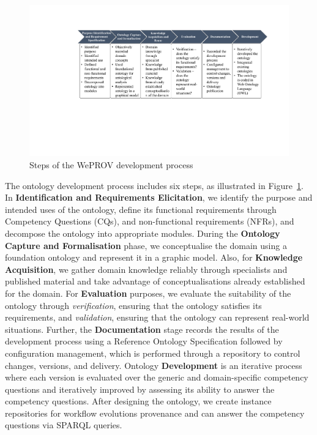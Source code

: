\documentclass[ao]{iosart2x}
\begin{document}
\begin{figure}[h]
    \centering
    \includegraphics[width=\linewidth]{figures/ontology-development-process.pdf}
    \caption{Steps of the WePROV development process}
    \label{fig:development-process}
\end{figure}

The ontology development process includes six steps, as illustrated in Figure~\ref{fig:development-process}. 
In \textbf{Identification and Requirements Elicitation}, we identify the purpose and intended uses of the ontology, define its functional requirements through Competency Questions (CQs), and non-functional requirements (NFRs), and decompose the ontology into appropriate modules. 
During the \textbf{Ontology Capture and Formalisation} phase, we conceptualise the domain using a foundation ontology and represent it in a graphic model.
Also, for \textbf{Knowledge Acquisition}, we gather domain knowledge reliably through specialists and published material and take advantage of conceptualisations already established for the domain. 
For \textbf{Evaluation} purposes, we evaluate the suitability of the ontology through \textit{verification}, ensuring that the ontology satisfies its requirements, and \textit{validation}, ensuring that the ontology can represent real-world situations.
Further, the \textbf{Documentation} stage records the results of the development process using a Reference Ontology Specification followed by configuration management, which is performed through a repository to control changes, versions, and delivery. 
Ontology \textbf{Development} is an iterative process where each version is evaluated over the generic and domain-specific competency questions and iteratively improved by assessing its ability to answer the competency questions. After designing the ontology, we create instance repositories for workflow evolutions provenance and can answer the competency questions via SPARQL queries.
\end{document}
